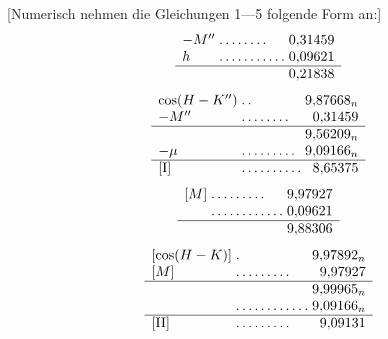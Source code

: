 [Numerisch nehmen die Gleichungen 1—5 folgende Form an:]
\[
\begin{array}{l@{\;}l@{\;}r}
-M''&\mathord{.}\,\mathord{.}\,\mathord{.}\,\mathord{.}\,\mathord{.}\,\mathord{.}\,\mathord{.}\,\mathord{.}&0{,}31459\\
h&\mathord{.}\,\mathord{.}\,\mathord{.}\,\mathord{.}\,\mathord{.}\,\mathord{.}\,\mathord{.}\,\mathord{.}\,\mathord{.}\,\mathord{.}\,\mathord{.}&0{,}09621\\\hline
&&0{,}21838
\end{array}
\]
\[
\begin{array}{l@{\;}l@{\;}r}
\cos(H-K'')&\mathord{.}\,\mathord{.}&9{,}87668_n\\
-M''&\mathord{.}\,\mathord{.}\,\mathord{.}\,\mathord{.}\,\mathord{.}\,\mathord{.}\,\mathord{.}\,\mathord{.}&0{,}31459\\\hline
&&9{,}56209_n\\
-\mu&\mathord{.}\,\mathord{.}\,\mathord{.}\,\mathord{.}\,\mathord{.}\,\mathord{.}\,\mathord{.}\,\mathord{.}\,\mathord{.}&9{,}09166_n\\\hline
[\mathrm{I}]&\mathord{.}\,\mathord{.}\,\mathord{.}\,\mathord{.}\,\mathord{.}\,\mathord{.}\,\mathord{.}\,\mathord{.}\,\mathord{.}\,\mathord{.}&8{,}65375
\end{array}
\]
\[
\begin{array}{l@{\;}l@{\;}r}
[M]&\mathord{.}\,\mathord{.}\,\mathord{.}\,\mathord{.}\,\mathord{.}\,\mathord{.}\,\mathord{.}\,\mathord{.}\,\mathord{.}&9{,}97927\\
&\mathord{.}\,\mathord{.}\,\mathord{.}\,\mathord{.}\,\mathord{.}\,\mathord{.}\,\mathord{.}\,\mathord{.}\,\mathord{.}\,\mathord{.}\,\mathord{.}\,\mathord{.}&0{,}09621\\\hline
&&9{,}88306
\end{array}
\]
\[
\begin{array}{l@{\;}l@{\;}r}
[\cos(H-K)]&\mathord{.}&9{,}97892_n\\
{}[M]&\mathord{.}\,\mathord{.}\,\mathord{.}\,\mathord{.}\,\mathord{.}\,\mathord{.}\,\mathord{.}\,\mathord{.}\,\mathord{.}&9{,}97927\\\hline
&&9{,}99965_n\\
&\mathord{.}\,\mathord{.}\,\mathord{.}\,\mathord{.}\,\mathord{.}\,\mathord{.}\,\mathord{.}\,\mathord{.}\,\mathord{.}\,\mathord{.}\,\mathord{.}\,\mathord{.}&9{,}09166_n\\\hline
[\mathrm{II}]&\mathord{.}\,\mathord{.}\,\mathord{.}\,\mathord{.}\,\mathord{.}\,\mathord{.}\,\mathord{.}\,\mathord{.}\,\mathord{.}&9{,}09131
\end{array}
\]
